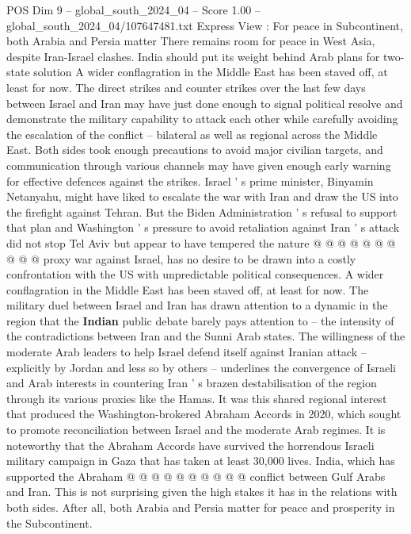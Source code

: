 \begin{textsample}{POS Dim 9 – global\_south\_2024\_04 – Score 1.00 – global\_south\_2024\_04/107647481.txt}  \label{ex:f9_pos_120}
Express View : For peace in Subcontinent, both Arabia and Persia matter There remains room for peace in West Asia, despite Iran-Israel clashes.
India should put its weight behind Arab plans for two-state solution A wider conflagration in the Middle East has been staved off, at least for now.
The direct strikes and counter strikes over the last few days between Israel and Iran may have just done enough to signal political resolve and demonstrate the military capability to attack each other while carefully avoiding the escalation of the conflict -- bilateral as well as regional across the Middle East.
Both sides took enough precautions to avoid major civilian targets, and communication through various channels may have given enough early warning for effective defences against the strikes.
Israel ' s prime minister, Binyamin Netanyahu, might have liked to escalate the war with Iran and draw the US into the firefight against Tehran.
But the Biden Administration ' s refusal to support that plan and Washington ' s pressure to avoid retaliation against Iran ' s attack did not stop Tel Aviv but appear to have tempered the nature @ @ @ @ @ @ @ @ @ @ proxy war against Israel, has no desire to be drawn into a costly confrontation with the US with unpredictable political consequences.
A wider conflagration in the Middle East has been staved off, at least for now.
The military duel between Israel and Iran has drawn attention to a dynamic in the region that the \textbf{Indian} public debate barely pays attention to -- the intensity of the contradictions between Iran and the Sunni Arab states.
The willingness of the moderate Arab leaders to help Israel defend itself against Iranian attack -- explicitly by Jordan and less so by others -- underlines the convergence of Israeli and Arab interests in countering Iran ' s brazen destabilisation of the region through its various proxies like the Hamas.
It was this shared regional interest that produced the Washington-brokered Abraham Accords in 2020, which sought to promote reconciliation between Israel and the moderate Arab regimes.
It is noteworthy that the Abraham Accords have survived the horrendous Israeli military campaign in Gaza that has taken at least 30,000 lives.
India, which has supported the Abraham @ @ @ @ @ @ @ @ @ @ conflict between Gulf Arabs and Iran.
This is not surprising given the high stakes it has in the relations with both sides.
After all, both Arabia and Persia matter for peace and prosperity in the Subcontinent.

\end{textsample}
